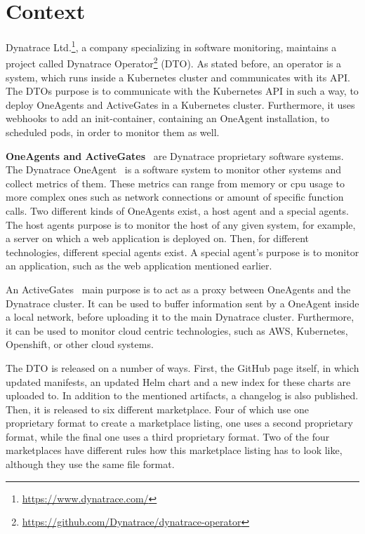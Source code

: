 \chapter{Context}\label{ch:context}

Dynatrace Ltd.\footnote{\url{https://www.dynatrace.com/}}, a company specializing in software monitoring, maintains a project called Dynatrace Operator\footnote{\url{https://github.com/Dynatrace/dynatrace-operator}} (DTO).
As stated before, an operator is a system, which runs inside a Kubernetes cluster and communicates with its API.
The DTOs purpose is to communicate with the Kubernetes API in such a way, to deploy OneAgents and ActiveGates in a Kubernetes cluster.
Furthermore, it uses webhooks to add an init-container, containing an OneAgent installation, to scheduled pods, in order to monitor them as well.

\textbf{OneAgents and ActiveGates}~\cite{oneagents,activegates} are Dynatrace proprietary software systems.
The Dynatrace OneAgent~\cite{oneagents} is a software system to monitor other systems and collect metrics of them.
These metrics can range from memory or cpu usage to more complex ones such as network connections or amount of specific function calls.
Two different kinds of OneAgents exist, a host agent and a special agents.
The host agents purpose is to monitor the host of any given system, for example, a server on which a web application is deployed on.
Then, for different technologies, different special agents exist.
A special agent's purpose is to monitor an application, such as the web application mentioned earlier.

An ActiveGates~\cite{activegates} main purpose is to act as a proxy between OneAgents and the Dynatrace cluster.
It can be used to buffer information sent by a OneAgent inside a local network, before uploading it to the main Dynatrace cluster.
Furthermore, it can be used to monitor cloud centric technologies, such as AWS, Kubernetes, Openshift, or other cloud systems.

The DTO is released on a number of ways.
First, the GitHub page itself, in which updated manifests, an updated Helm chart and a new index for these charts are uploaded to.
In addition to the mentioned artifacts, a changelog is also published.
Then, it is released to six different marketplace.
Four of which use one proprietary format to create a marketplace listing, one uses a second proprietary format, while the final one uses a third proprietary format.
Two of the four marketplaces have different rules how this marketplace listing has to look like, although they use the same file format.

